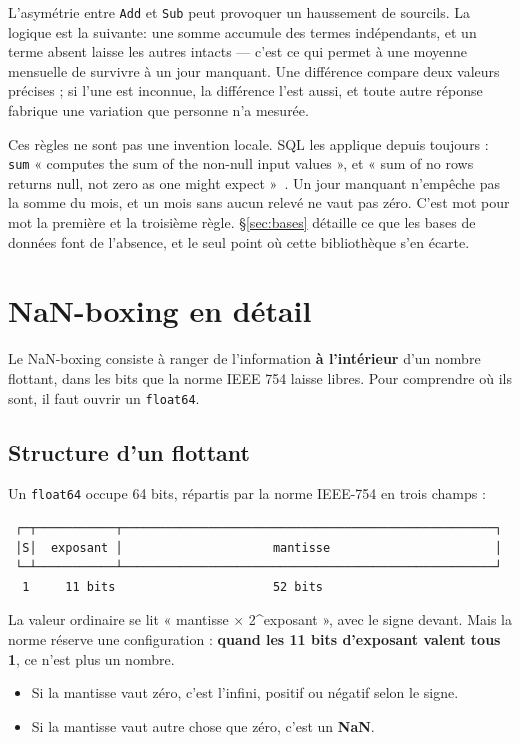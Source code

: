 \documentclass[11pt,a4paper]{report}
\providecommand{\tightlist}{\setlength{\itemsep}{0pt}\setlength{\parskip}{0pt}}
\begin{document}
L'asymétrie entre \texttt{Add} et \texttt{Sub} peut provoquer un
haussement de sourcils. La logique est la suivante: une somme accumule
des termes indépendants, et un terme absent laisse les autres intacts
--- c'est ce qui permet à une moyenne mensuelle de survivre à un jour
manquant. Une différence compare deux valeurs précises ; si l'une est
inconnue, la différence l'est aussi, et toute autre réponse fabrique une
variation que personne n'a mesurée.

Ces règles ne sont pas une invention locale. SQL les applique depuis
toujours : \texttt{sum} « computes the sum of the non-null input
values », et « sum of no rows returns null, not zero as one might
expect »~\cite{pgaggregates}. Un jour manquant n'empêche pas la somme du
mois, et un mois sans aucun relevé ne vaut pas zéro. C'est mot pour mot
la première et la troisième règle. §\ref{sec:bases} détaille ce que les
bases de données font de l'absence, et le seul point où cette
bibliothèque s'en écarte.

\section{NaN-boxing en détail}

Le NaN-boxing consiste à ranger de l'information \textbf{à l'intérieur}
d'un nombre flottant, dans les bits que la norme IEEE 754 laisse libres.
Pour comprendre où ils sont, il faut ouvrir un \texttt{float64}.

\subsection{Structure d'un flottant}

Un \texttt{float64} occupe 64 bits, répartis par la norme IEEE-754 en
trois champs :

\begin{verbatim}
 ┌─┬───────────┬────────────────────────────────────────────────────┐
 │S│  exposant │                     mantisse                       │
 └─┴───────────┴────────────────────────────────────────────────────┘
  1     11 bits                      52 bits
\end{verbatim}

La valeur ordinaire se lit « mantisse × 2\^{}exposant », avec le signe
devant. Mais la norme réserve une configuration : \textbf{quand les 11
bits d'exposant valent tous 1}, ce n'est plus un nombre.

\begin{itemize}
\tightlist
\item
  Si la mantisse vaut zéro, c'est l'infini, positif ou négatif selon le
  signe.
\item
  Si la mantisse vaut autre chose que zéro, c'est un \textbf{NaN}.
\end{itemize}
\end{document}
